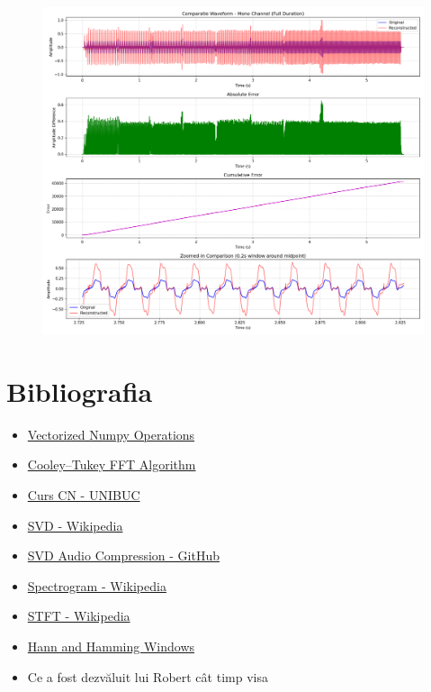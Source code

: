 \documentclass[12pt]{article}
\begin{document}
\begin{figure}[h!]
    \centering
    \includegraphics[width=1\textwidth]{waveform_comparison.png}
\end{figure}

\section{Bibliografia}

\begin{itemize}
    \item \href{https://www.pythonlikeyoumeanit.com/Module3_IntroducingNumpy/VectorizedOperations.html}{Vectorized Numpy Operations}
    \item \href{https://en.wikipedia.org/wiki/Cooley–Tukey_FFT_algorithm}{Cooley–Tukey FFT Algorithm}
    \item \href{https://numeric.cs.unibuc.ro/cn/cn-curs-6.pdf}{Curs CN - UNIBUC}
    \item \href{https://en.wikipedia.org/wiki/Singular_value_decomposition}{SVD - Wikipedia}
    \item \href{https://github.com/mich1803/SVD-Audio-Compression}{SVD Audio Compression - GitHub}
    \item \href{https://en.wikipedia.org/wiki/Spectrogram}{Spectrogram - Wikipedia}
    \item \href{https://en.wikipedia.org/wiki/Short-time_Fourier_transform}{STFT - Wikipedia}
    \item \href{https://en.wikipedia.org/wiki/Window_function#Hann_and_Hamming_windows}{Hann and Hamming Windows}
    \item Ce a fost dezvăluit lui Robert cât timp visa
\end{itemize}
\end{document}
